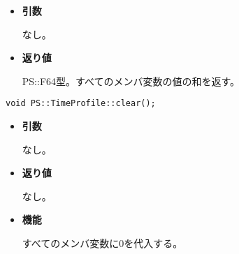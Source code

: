 \begin{itemize}

\item{{\bf 引数}}

なし。

\item{{\bf 返り値}}

{PS::F64}型。すべてのメンバ変数の値の和を返す。

\end{itemize}

\mbox{}

\begin{screen}
\begin{verbatim}
void PS::TimeProfile::clear();
\end{verbatim}
\end{screen}

\begin{itemize}

\item{{\bf 引数}}

なし。

\item{{\bf 返り値}}

なし。

\item{{\bf 機能}}

すべてのメンバ変数に0を代入する。

\end{itemize}
